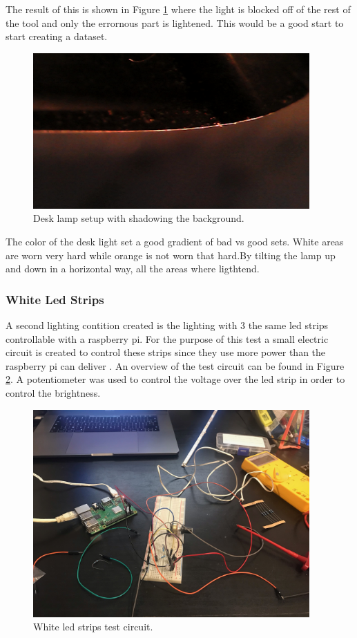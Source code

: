 The result of this is shown in Figure \ref{fig:setup:desklamp:blackbg} where the light is blocked off of the rest of the tool and only the errornous part is lightened. This would be a good start to start creating a dataset.

\begin{figure}[hbtp]
\includegraphics[width=4.166667in, keepaspectratio=true]{./fig/Camera_setup/Light/Desk_Lamp_Test/eerste-opstelling_donkere_achtergrond2.jpg}
\caption{Desk lamp setup with shadowing the background.}
\label{fig:setup:desklamp:blackbg}
\end{figure}

The color of the desk light set a good gradient of bad vs good sets. White areas are worn very hard while orange is not worn that hard.By tilting the lamp up and down in a horizontal way, all the areas where ligthtend. 


		\subsubsection{White Led Strips}

		A second lighting contition created is the lighting with 3 the same led strips controllable with a raspberry pi. 
		For the purpose of this test a small electric circuit is created to control these strips since they use more power than the raspberry pi can deliver \cite{rpi}. An overview of the test circuit can be found in Figure \ref{fig:setup:whiteled:circuit}. A potentiometer was used to control the voltage over the led strip in order to control the brightness. 


\begin{figure}[hbtp]
\includegraphics[height=3.125000in, keepaspectratio=true]{./fig/Camera_setup/Light/White_Led_Strips/Test_setup_ledstrip.jpeg}
\caption{White led strips test circuit.}
\label{fig:setup:whiteled:circuit}
\end{figure}

